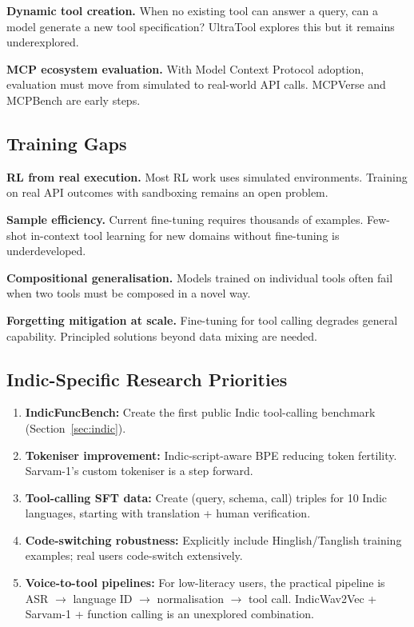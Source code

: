 \documentclass[11pt]{article}
\begin{document}
\textbf{Dynamic tool creation.} When no existing tool can answer a query, can a model generate a
new tool specification? UltraTool explores this but it remains underexplored.

\textbf{MCP ecosystem evaluation.} With Model Context Protocol adoption, evaluation must move from
simulated to real-world API calls. MCPVerse and MCPBench are early steps.

\subsection{Training Gaps}

\textbf{RL from real execution.} Most RL work uses simulated environments. Training on real API
outcomes with sandboxing remains an open problem.

\textbf{Sample efficiency.} Current fine-tuning requires thousands of examples. Few-shot
in-context tool learning for new domains without fine-tuning is underdeveloped.

\textbf{Compositional generalisation.} Models trained on individual tools often fail when two tools
must be composed in a novel way.

\textbf{Forgetting mitigation at scale.} Fine-tuning for tool calling degrades general capability.
Principled solutions beyond data mixing are needed.

\subsection{Indic-Specific Research Priorities}

\begin{enumerate}[leftmargin=1.4em, itemsep=3pt]
  \item \textbf{IndicFuncBench:} Create the first public Indic tool-calling benchmark
        (Section~\ref{sec:indic}).
  \item \textbf{Tokeniser improvement:} Indic-script-aware BPE reducing token fertility.
        Sarvam-1's custom tokeniser is a step forward.
  \item \textbf{Tool-calling SFT data:} Create (query, schema, call) triples for 10 Indic
        languages, starting with translation + human verification.
  \item \textbf{Code-switching robustness:} Explicitly include Hinglish/Tanglish training
        examples; real users code-switch extensively.
  \item \textbf{Voice-to-tool pipelines:} For low-literacy users, the practical pipeline is
        ASR $\rightarrow$ language ID $\rightarrow$ normalisation $\rightarrow$ tool call.
        IndicWav2Vec + Sarvam-1 + function calling is an unexplored combination.
\end{enumerate}
\end{document}
